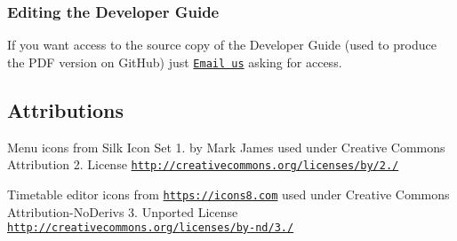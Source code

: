 \subsubsection*{Editing the Developer Guide}


\begin{DoxyItemize}
\item If you want access to the source copy of the Developer Guide (used to produce the P\+DF version on Git\+Hub) just \href{mailto:railwayfeedback@gmail.com}{\tt Email us} asking for access.
\end{DoxyItemize}

\subsection*{Attributions}

Menu icons from Silk Icon Set 1. by Mark James used under Creative Commons Attribution 2. License \href{http://creativecommons.org/licenses/by/2.5/}{\tt http\+://creativecommons.\+org/licenses/by/2./}

Timetable editor icons from \href{https://icons8.com}{\tt https\+://icons8.\+com} used under Creative Commons Attribution-\/\+No\+Derivs 3. Unported License \href{http://creativecommons.org/licenses/by-nd/3.0/}{\tt http\+://creativecommons.\+org/licenses/by-\/nd/3./} 